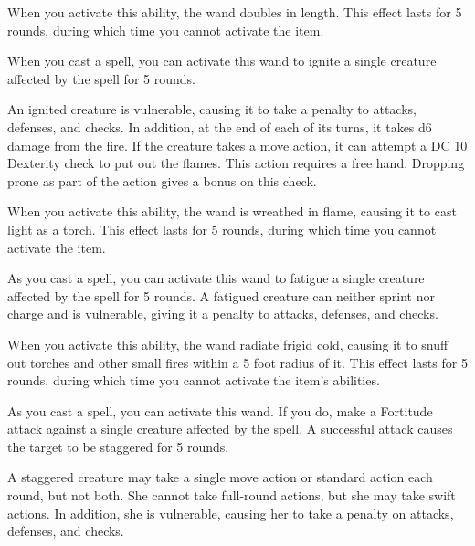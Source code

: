When you activate this ability, the wand doubles in length. This effect lasts for 5 rounds, during which time you cannot activate the item.


 When you cast a spell, you can activate this wand to ignite a single creature affected by the spell for 5 rounds.

An ignited creature is vulnerable, causing it to take a  penalty to attacks, defenses, and checks. In addition, at the end of each of its turns, it takes d6 damage from the fire. If the creature takes a move action, it can attempt a DC 10 Dexterity check to put out the flames. This action requires a free hand. Dropping prone as part of the action gives a  bonus on this check.

When you activate this ability, the wand is wreathed in flame, causing it to cast light as a torch. This effect lasts for 5 rounds, during which time you cannot activate the item.


 As you cast a spell, you can activate this wand to fatigue a single creature affected by the spell for 5 rounds. A fatigued creature can neither sprint nor charge and is vulnerable, giving it a  penalty to attacks, defenses, and checks.

When you activate this ability, the wand radiate frigid cold, causing it to snuff out torches and other small fires within a 5 foot radius of it. This effect lasts for 5 rounds, during which time you cannot activate the item's abilities.


 As you cast a spell, you can activate this wand. If you do, make a Fortitude attack against a single creature affected by the spell. A successful attack causes the target to be staggered for 5 rounds.

A staggered creature may take a single move action or standard action each round, but not both. She cannot take full-round actions, but she may take swift actions. In addition, she is vulnerable, causing her to take a  penalty on attacks, defenses, and checks.

